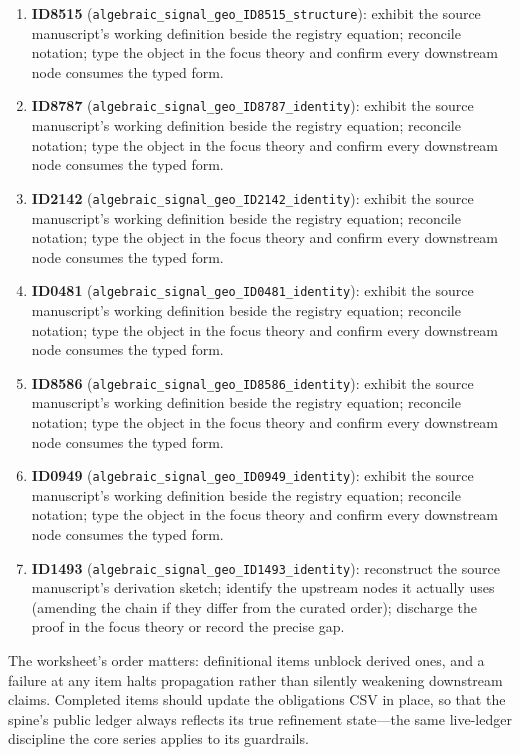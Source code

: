 \documentclass[11pt]{article}
\theoremstyle{remark}
\begin{document}
\begin{enumerate}
\item \textbf{ID8515} (\texttt{algebraic\_signal\_geo\_ID8515\_structure}): exhibit the source manuscript's working definition beside the registry equation; reconcile notation; type the object in the focus theory and confirm every downstream node consumes the typed form.
\item \textbf{ID8787} (\texttt{algebraic\_signal\_geo\_ID8787\_identity}): exhibit the source manuscript's working definition beside the registry equation; reconcile notation; type the object in the focus theory and confirm every downstream node consumes the typed form.
\item \textbf{ID2142} (\texttt{algebraic\_signal\_geo\_ID2142\_identity}): exhibit the source manuscript's working definition beside the registry equation; reconcile notation; type the object in the focus theory and confirm every downstream node consumes the typed form.
\item \textbf{ID0481} (\texttt{algebraic\_signal\_geo\_ID0481\_identity}): exhibit the source manuscript's working definition beside the registry equation; reconcile notation; type the object in the focus theory and confirm every downstream node consumes the typed form.
\item \textbf{ID8586} (\texttt{algebraic\_signal\_geo\_ID8586\_identity}): exhibit the source manuscript's working definition beside the registry equation; reconcile notation; type the object in the focus theory and confirm every downstream node consumes the typed form.
\item \textbf{ID0949} (\texttt{algebraic\_signal\_geo\_ID0949\_identity}): exhibit the source manuscript's working definition beside the registry equation; reconcile notation; type the object in the focus theory and confirm every downstream node consumes the typed form.
\item \textbf{ID1493} (\texttt{algebraic\_signal\_geo\_ID1493\_identity}): reconstruct the source manuscript's derivation sketch; identify the upstream nodes it actually uses (amending the chain if they differ from the curated order); discharge the proof in the focus theory or record the precise gap.
\end{enumerate}

The worksheet's order matters: definitional items unblock derived ones, and a failure at any item halts propagation rather than silently weakening downstream claims. Completed items should update the obligations CSV in place, so that the spine's public ledger always reflects its true refinement state---the same live-ledger discipline the core series applies to its guardrails.
\end{document}
